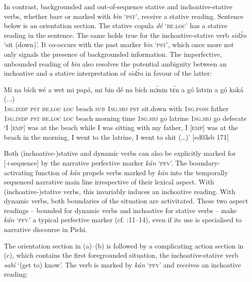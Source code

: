 In contrast, backgrounded and out-of-sequence stative and inchoative-stative verbs, whether bare or marked with \textit{bin} ‘\textsc{pst}’, receive a stative reading. Sentence  below is an orientation section. The stative copula \textit{dé} \textsc{‘be.loc’} has a stative reading in the sentence. The same holds true for the inchoative-stative verb \textit{sidɔ́n} ‘sit (down)’. It co-occurs with the past marker \textit{bin} ‘\textsc{pst}’, which once more not only signals the presence of backgrounded information. The imperfective, unbounded reading of \textit{bin} also resolves the potential ambiguity between an inchoative and a stative interpretation of \textit{sidɔ́n} in favour of the latter:


\ea%
    \label{ex:key:458}
    \gll Mí          na  bích    wé  a        wet
mi    papá,  mi    bin  dé    na  bích    mɔ́nin  tɛ́n 
a    gó  latrin  a    gó  kaká  (...)\\
\textsc{1sg.indp}  \textsc{pst}  \textsc{be.loc}  \textsc{loc}  beach  \textsc{sub}  \textsc{1sg.sbj}  \textsc{pst}  sit.down  with
\textsc{1sg.poss}  father  \textsc{1sg.indp}  \textsc{pst}  \textsc{be.loc}  \textsc{loc}  beach  morning  time
\textsc{1sg.sbj}  go  latrine  \textsc{1sg.sbj}  go  defecate\\

\glt ‘I [\textsc{emp}] was at the beach while I was sitting with my father, I [\textsc{emp}] was 
at the beach in the morning, I went to the latrine, I went to shit (…)’ [ed03sb 171]
\z

Both (inchoative-)stative and dynamic verbs can also be explicitly marked for [+sequence] by the narrative perfective marker \textit{kán} ‘\textsc{pfv}’. The boundary-activating function of \textit{kán} propels verbs marked by \textit{kán} into the temporally sequenced narrative main line irrespective of their lexical aspect. With (inchoative-)stative verbs, this invariably induces an inchoative reading. With dynamic verbs, both boundaries of the situation are activitated. These two aspect readings – bounded for dynamic verbs and inchoative for stative verbs – make \textit{kán} ‘\textsc{pfv}’ a typical perfective marker (cf. \citealt{Sasse1991b}:11–14), even if its use is specialised to narrative discourse in Pichi. 


The orientation section in (a)–(b) is followed by a complicating action section in (c), which contains the first foregrounded situation, the inchoative-stative verb \textit{sabí} ‘(get to) know’. The verb is marked by \textit{kán} ‘\textsc{pfv}’ and receives an inchoative reading: 



